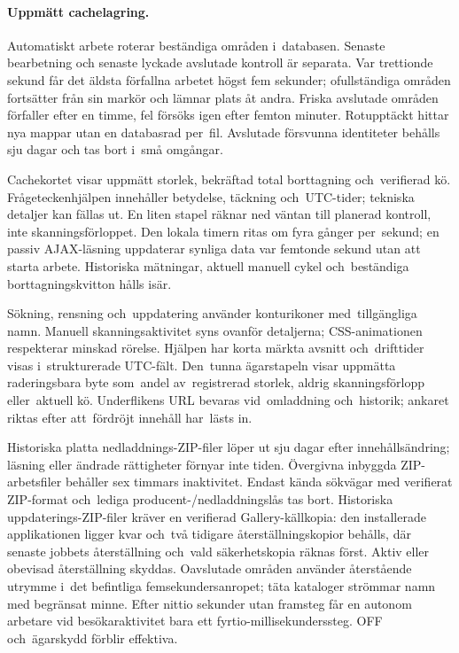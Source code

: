 \documentclass[11pt,a4paper]{article}
\begin{document}
\paragraph{Uppmätt cachelagring.}
Automatiskt arbete roterar beständiga områden i~databasen. Senaste bearbetning
och senaste lyckade avslutade kontroll är separata. Var trettionde sekund får
det äldsta förfallna arbetet högst fem sekunder; ofullständiga områden
fortsätter från sin markör och lämnar plats åt andra. Friska avslutade områden
förfaller efter en timme, fel försöks igen efter femton minuter. Rotupptäckt
hittar nya mappar utan en databasrad per~fil. Avslutade försvunna identiteter
behålls sju dagar och tas bort i~små omgångar.

Cachekortet visar uppmätt storlek, bekräftad total borttagning och~verifierad
kö. Frågeteckenhjälpen innehåller betydelse, täckning och~UTC-tider; tekniska
detaljer kan fällas ut. En liten stapel räknar ned väntan till planerad
kontroll, inte skanningsförloppet. Den lokala timern ritas om fyra gånger
per~sekund; en passiv AJAX-läsning uppdaterar synliga data var femtonde sekund
utan att starta arbete. Historiska mätningar, aktuell manuell cykel
och~beständiga borttagningskvitton hålls isär.

Sökning, rensning och~uppdatering använder konturikoner med~tillgängliga namn.
Manuell skanningsaktivitet syns ovanför detaljerna; CSS-animationen respekterar
minskad rörelse. Hjälpen har korta märkta avsnitt och~drifttider visas
i~strukturerade UTC-fält. Den~tunna ägarstapeln visar uppmätta raderingsbara
byte som~andel av~registrerad storlek, aldrig skanningsförlopp eller~aktuell kö.
Underflikens URL bevaras vid~omladdning och~historik; ankaret riktas efter
att~fördröjt innehåll har~lästs in.

Historiska platta nedladdnings-ZIP-filer löper ut sju dagar efter
innehållsändring; läsning eller ändrade rättigheter förnyar inte tiden.
Övergivna inbyggda ZIP-arbetsfiler behåller sex timmars inaktivitet. Endast
kända sökvägar med verifierat ZIP-format och~lediga producent-/nedladdningslås
tas bort. Historiska uppdaterings-ZIP-filer kräver en verifierad
Gallery-källkopia: den installerade applikationen ligger kvar och~två tidigare
återställningskopior behålls, där senaste jobbets återställning och~vald
säkerhetskopia räknas först. Aktiv eller obevisad återställning skyddas.
Oavslutade områden använder återstående utrymme i~det befintliga
femsekundersanropet; täta kataloger strömmar namn med begränsat minne. Efter
nittio sekunder utan framsteg får en autonom arbetare vid besökaraktivitet bara
ett fyrtio-millisekunderssteg. OFF och~ägarskydd förblir effektiva.
\end{document}
